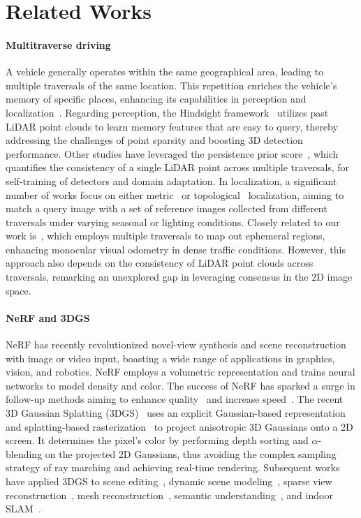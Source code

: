 \section{Related Works}
\paragraph{Multitraverse driving} 
A vehicle generally operates within the same geographical area, leading to multiple traversals of the same location. This repetition enriches the vehicle's memory of specific places, enhancing its capabilities in perception and localization~\cite{you2024better,you2023enhancing,xiong2023neural,yuan2024presight}. Regarding perception, the Hindsight framework~\cite{you2021hindsight} utilizes past LiDAR point clouds to learn memory features that are easy to query, thereby addressing the challenges of point sparsity and boosting 3D detection performance. Other studies have leveraged the persistence prior score~\cite{you2022learning,you2022unsupervised}, which quantifies the consistency of a single LiDAR point across multiple traversals, for self-training of detectors and domain adaptation. In localization, a significant number of works focus on either metric~\cite{maddern20171,toft2020long} or topological~\cite{lowry2015visual,li2023collaborative} localization, aiming to match a query image with a set of reference images collected from different traversals under varying seasonal or lighting conditions. Closely related to our work is~\cite{barnes2018driven}, which employs multiple traversals to map out ephemeral regions, enhancing monocular visual odometry in dense traffic conditions. However, this approach also depends on the consistency of LiDAR point clouds across traversals, remarking an unexplored gap in leveraging consensus in the 2D image space.

\paragraph{NeRF and 3DGS} NeRF has recently revolutionized novel-view synthesis and scene reconstruction with image or video input, boasting a wide range of applications in graphics, vision, and robotics. NeRF employs a volumetric representation and trains neural networks to model density and color. The success of NeRF has sparked a surge in follow-up methods aiming to enhance quality~\cite{barron2021mip,niemeyer2022regnerf,barron2023zip} and increase speed~\cite{xu2022point,fridovich2022plenoxels, muller2022instant}. The recent 3D Gaussian Splatting (3DGS)~\cite{kerbl20233d} uses an explicit Gaussian-based representation and splatting-based rasterization~\cite{zwicker2002ewa} to project anisotropic 3D Gaussians onto a 2D screen. It determines the pixel's color by performing depth sorting and $\alpha$-blending on the projected 2D Gaussians, thus avoiding the complex sampling strategy of ray marching and achieving real-time rendering. Subsequent works have applied 3DGS to scene editing~\cite{chen2023gaussianeditor}, dynamic scene modeling~\cite{luiten2023dynamic,yang2023gs4d}, sparse view reconstruction~\cite{fan2024instantsplat}, mesh reconstruction~\cite{guedon2023sugar}, semantic understanding~\cite{zhou2023feature,qin2023langsplat}, and indoor SLAM~\cite{Matsuki:Murai:etal:CVPR2024}.

